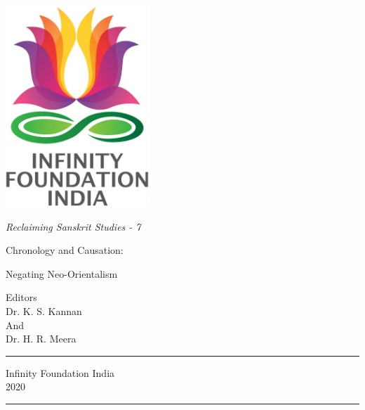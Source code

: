 \thispagestyle{empty}
\begin{center}
\includegraphics[scale=0.3]{images/logo.png}
\bigskip

{\fontsize{10}{14}\selectfont\sl
Reclaiming Sanskrit Studies - 7
}

\bigskip
\end{center}
\medskip

\begin{center}
{{\fontsize{20}{24}\selectfont Chronology and Causation:}}

{{\fontsize{20}{24}\selectfont Negating Neo-Orientalism}}

\vfill


\bigskip
\bigskip

{\fontsize{14}{18}\selectfont 
Editors\\[3pt]
Dr. K. S. Kannan\\
And\\[3pt]
Dr. H. R. Meera}\par
\vfill

\rule{5cm}{1pt}

{\fontsize{12}{14}\selectfont
Infinity Foundation India\\[4pt]
2020}

\rule{5cm}{1pt}
\end{center}




